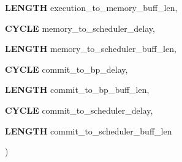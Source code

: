 {{\begin{DoxyParamCaption}
\item[{{\bf LENGTH}}]{execution\_\-to\_\-memory\_\-buff\_\-len, }
\item[{{\bf CYCLE}}]{memory\_\-to\_\-scheduler\_\-delay, }
\item[{{\bf LENGTH}}]{memory\_\-to\_\-scheduler\_\-buff\_\-len, }
\item[{{\bf CYCLE}}]{commit\_\-to\_\-bp\_\-delay, }
\item[{{\bf LENGTH}}]{commit\_\-to\_\-bp\_\-buff\_\-len, }
\item[{{\bf CYCLE}}]{commit\_\-to\_\-scheduler\_\-delay, }
\item[{{\bf LENGTH}}]{commit\_\-to\_\-scheduler\_\-buff\_\-len}
\end{DoxyParamCaption}
)}}
\label{classo3__sysCore_aa2fc24a24dd599ff3393c62910cbcb06}

